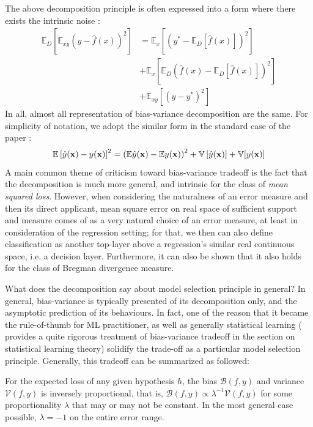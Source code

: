 The above decomposition principle is often expressed into a form where there exists the intrinsic noise \cite{brown2024biasvariance}: 
\begin{equation}
    \begin{split}
        \mathbb{E}_D \left[ \mathbb{E}_{xy} \left( y - \hat{f}(x) \right)^2 \right]
        &= 
         \mathbb{E}_x \left[ \left( y^* - \mathbb{E}_D[\hat{f}(x)] \right)^2 \right]\\
        &+ \mathbb{E}_x \left[ \mathbb{E}_D \left( \hat{f}(x) - \mathbb{E}_D[\hat{f}(x)] \right)^2 \right] \\
        &+ \mathbb{E}_{xy} \left[ \left( y - y^* \right)^2 \right]
    \end{split}
    \end{equation}
In all, almost all representation of bias-variance decomposition are the same. For simplicity of notation, we adopt the similar form in the standard case of the paper \cite{adlam2020understandingdoubledescentrequires}: 
\begin{equation}
    \mathbb{E} \left[{\hat{y}(\mathbf{x})-y(\mathbf{x})}\right]^2 = \left({\mathbb{E}\hat{y}(\mathbf{x}) - \mathbb{E} y(\mathbf{x})}\right)^2 + \mathbb{V}\left[{\hat{y}(\mathbf{x})}\right] + \mathbb{V}[{y(\mathbf{x})}]
\end{equation}
A main common theme of criticism toward bias-variance tradeoff is the fact that the decomposition is much more general, and intrinsic for the class of \textit{mean squared loss}. However, when considering the naturalness of an error measure and then its direct applicant, mean square error on real space of sufficient support and measure comes of as a very natural choice of an error measure, at least in consideration of the regression setting; for that, we then can also define classification as another top-layer above a regression's similar real continuous space, i.e. a decision layer. Furthermore, it can also be shown \cite{brown2024biasvariance,PfauBregmanDivergence} that it also holds for the class of Bregman divergence measure. 

What does the decomposition say about model selection principle in general? In general, bias-variance is typically presented of its decomposition only, and the asymptotic prediction of its behaviours. In fact, one of the reason that it became the rule-of-thumb for ML practitioner, as well as generally statistical learning (\cite{lafon_understanding_2024} provides a quite rigorous treatment of bias-variance tradeoff in the section on statistical learning theory) solidify the trade-off as a particular model selection principle. Generally, this tradeoff can be summarized as followed: 
\begin{theorem}\label{thm:bias-variance}
    For the expected loss of any given hypothesis $h$, the bias $\mathcal{B}(f,y)$ and variance $\mathcal{V}(f,y)$ is inversely proportional, that is, $\mathcal{B}(f,y)\propto \lambda^{-1} \mathcal{V}(f,y)$ for some proportionality $\lambda$ that may or may not be constant. In the most general case possible, $\lambda = -1$ on the entire error range. 
\end{theorem}

